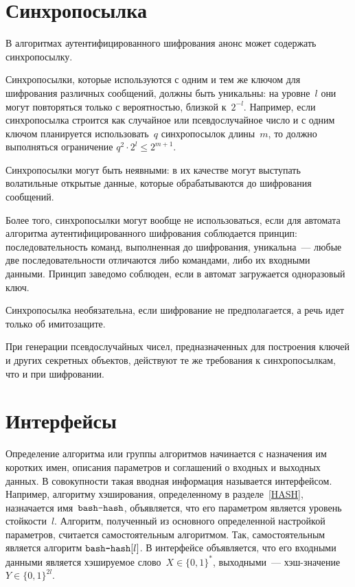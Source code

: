 \section{Синхропосылка}\label{COMMON.Nonce}

В алгоритмах аутентифицированного шифрования анонс может содержать 
синхропосылку.

Синхропосылки, которые используются с одним и тем же ключом для шифрования 
различных сообщений, должны быть уникальны: на уровне~$l$ они могут повторяться 
только с вероятностью, близкой к~$2^{-l}$. Например, если 
синхропосылка строится как случайное или псевдослучайное число и с одним ключом 
планируется использовать~$q$ синхропосылок длины~$m$, то должно выполняться 
ограничение $q^2\cdot 2^l\leq 2^{m+1}$.

Синхропосылки могут быть неявными: в их качестве могут выступать волатильные 
открытые данные, которые обрабатываются до шифрования сообщений.

Более того, синхропосылки могут вообще не использоваться, если 
для автомата алгоритма аутентифицированного шифрования
соблюдается принцип: последовательность команд, выполненная до шифрования, 
уникальна~--- любые две последовательности отличаются либо командами,
либо их входными данными.
%
Принцип заведомо соблюден, если в автомат загружается одноразовый ключ.

Синхропосылка необязательна, если шифрование не 
предполагается, а речь идет только об имитозащите.

При генерации псевдослучайных чисел, предназначенных для построения 
ключей и других секретных объектов, действуют те же требования к 
синхропосылкам, что и при шифровании.

\section{Интерфейсы}\label{COMMON.IFace}

Определение алгоритма или группы алгоритмов начинается с назначения им 
коротких имен, описания параметров и соглашений о входных и выходных данных.
В совокупности такая вводная информация называется интерфейсом.
%
Например, алгоритму хэширования, определенному в разделе~\ref{HASH}, 
назначается имя~$\texttt{bash-hash}$, объявляется, что его параметром является 
уровень стойкости~$l$. 
%
Алгоритм, полученный из основного определенной настройкой параметров,
считается самостоятельным алгоритмом. Так, самостоятельным является 
алгоритм $\texttt{bash-hash}[l]$. 
%
В интерфейсе объявляется, что его входными данными является хэшируемое 
слово~$X\in\{0,1\}^*$, выходными~--- хэш-значение~$Y\in\{0,1\}^{2l}$.

